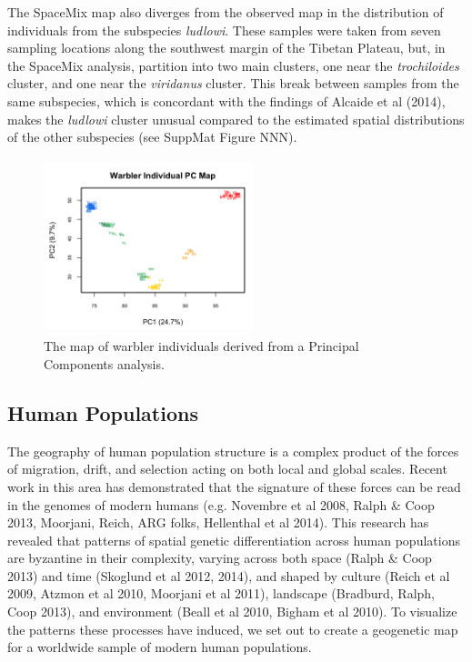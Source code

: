 \documentclass[12pt]{article}
\begin{document}
The SpaceMix map also diverges from the observed map in the distribution of individuals from the subspecies \textit{ludlowi}.  These samples were taken from seven sampling locations along the southwest margin of the Tibetan Plateau, but, in the SpaceMix analysis, partition into two main clusters, one near the \textit{trochiloides} cluster, and one near the \textit{viridanus} cluster.  This break between samples from the same subspecies, which is concordant with the findings of Alcaide et al (2014), makes the \textit{ludlowi} cluster unusual compared to the estimated spatial distributions of the other subspecies (see SuppMat Figure NNN).

\begin{figure}
	\centering
	\includegraphics[width=2.4in,height=2in]{figs/warblers/warb_ind_PC_map.png}
	\caption{The map of warbler individuals derived from a Principal Components analysis.}\label{warb_ind_PC_map}
\end{figure}

%
\newpage
\subsection*{Human Populations}
The geography of human population structure is a complex product of the forces of migration, drift, and selection acting on both local and global scales.  Recent work in this area has demonstrated that the signature of these forces can be read in the genomes of modern humans (e.g. Novembre et al 2008, Ralph \& Coop 2013, Moorjani, Reich, ARG folks, Hellenthal et al 2014).  This research has revealed that patterns of spatial genetic differentiation across human populations are byzantine in their complexity, varying across both space (Ralph \& Coop 2013) and time (Skoglund et al 2012, 2014), and shaped by culture (Reich et al 2009, Atzmon et al 2010, Moorjani et al 2011), landscape (Bradburd, Ralph, Coop 2013), and environment (Beall et al 2010, Bigham et al 2010).  To visualize the patterns these processes have induced, we set out to create a geogenetic map for a worldwide sample of modern human populations.  
\end{document}
